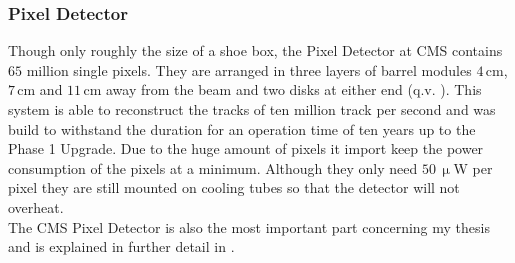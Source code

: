 \documentclass[british,11pt,a4paper]{memoir}
\begin{document}
\subsubsection{Pixel Detector}
Though only roughly the size of a shoe box, the Pixel Detector at \ac{CMS} contains $65$ million single pixels. They are arranged in three layers of barrel modules $4\,$cm, $7\,$cm and $11\,$cm away from the beam and two disks at either end (q.v. ). This system is able to reconstruct the tracks of ten million track per second and was build to withstand the duration for an operation time of ten years up to the Phase 1 Upgrade. Due to the huge amount of pixels it import keep the power consumption of the pixels at a minimum. Although they only need $50\,\upmu$W per pixel they are still mounted on cooling tubes so that the detector will not overheat.\\
The \ac{CMS} Pixel Detector is also the most important part concerning my thesis and is explained in further detail in .
\end{document}
